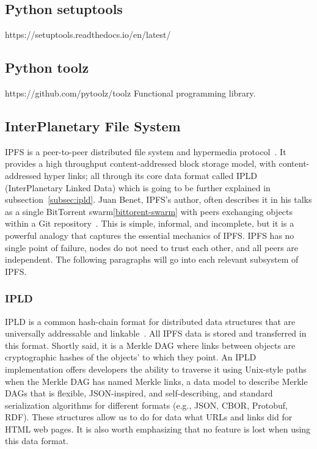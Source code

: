 \subsection{Python setuptools}
https://setuptools.readthedocs.io/en/latest/

\subsection{Python toolz}
https://github.com/pytoolz/toolz
Functional programming library.

\subsection{\label{sec:ipfs}InterPlanetary File System}

IPFS is a peer-to-peer distributed file system and hypermedia protocol~\cite{IPFS}.
It provides a high throughput content-addressed block storage model, with content-addressed hyper links; all through its core data format called IPLD (InterPlanetary Linked Data) which is going to be further explained in subsection~\ref{subsec:ipld}.
Juan Benet, IPFS's author, often describes it in his talks as a single BitTorrent swarm\ref{bittorent-swarm} with peers exchanging objects within a Git repository~\cite{github:ipfspaper}.
This is simple, informal, and incomplete, but it is a powerful analogy that captures the essential mechanics of IPFS.
IPFS has no single point of failure, nodes do not need to trust each other, and all peers are independent.
The following paragraphs will go into each relevant subsystem of IPFS.

\subsubsection{\label{subsec:ipld}IPLD}

IPLD is a common hash-chain format for distributed data structures that are universally addressable and linkable~\cite{github:ipld}.
All IPFS data is stored and transferred in this format.
Shortly said, it is a Merkle DAG where links between objects are cryptographic hashes of the objects' to which they point.
An IPLD implementation offers developers the ability to traverse it using Unix-style paths when the Merkle DAG has named Merkle links, a data model to describe Merkle DAGs that is flexible, JSON-inspired, and self-describing, and standard serialization algorithms for different formats (e.g., JSON, CBOR, Protobuf, RDF).
These structures allow us to do for data what URLs and links did for HTML web pages.
It is also worth emphasizing that no feature is lost when using this data format.

